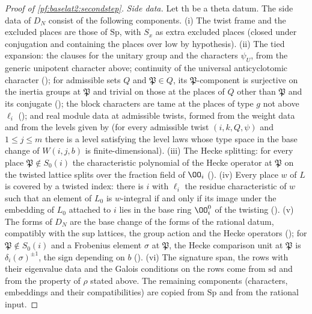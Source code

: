 \begin{proof}[Proof of \cref{pf:baselat2:secondstep}]
\emph{Side data.} Let $\mathrm{th}$ be a theta datum. The side data of $D_N$ consist of the following
components.
(i) The twist frame and the excluded places are those of $\mathrm{Sp}$, with $S_x$ as extra excluded places
(closed under conjugation and containing the places over $\mathrm{low}$ by hypothesis).
(ii) The tied expansion: the clauses for the unitary group and the characters $\psi_U$, from the generic
unipotent character above; continuity of the universal anticyclotomic character
(); for admissible sets $Q$ and $\mathfrak P\in Q$,
its $\mathfrak P$-component is surjective on the inertia groups at $\mathfrak P$ and trivial on those at the places of $Q$
other than $\mathfrak P$ and its conjugate (); the block
characters are tame at the places of type $g$ not above $\ell_i$
(); and real
module data at admissible twists, formed from the weight data and from the levels given by
 (for every admissible twist $(i,k,Q,\psi)$ and
$1\le j\le m$ there is a level satisfying the level laws whose type space in the base change of $W(i,j,b)$ is
finite-dimensional).
(iii) The Hecke splitting: for every place $\mathfrak P\notin S_0(i)$ the characteristic polynomial of the Hecke
operator at $\mathfrak P$ on the twisted lattice splits over the fraction field of $\OO_i$
().
(iv) Every place $w$ of $L$ is covered by a twisted index: there is $i$ with $\ell_i$ the residue characteristic of
$w$ such that an element of $L_0$ is $w$-integral if and only if its image under the embedding of $L_0$ attached
to $i$ lies in the base ring $\OO^0_i$ of the twisting
().
(v) The forms of $D_N$ are the base change of the forms of the rational datum, compatibly with the sup
lattices, the group action and the Hecke operators
(); for $\mathfrak P\notin S_0(i)$ and a
Frobenius element $\sigma$ at $\mathfrak P$, the Hecke comparison unit at $\mathfrak P$ is $\delta_i(\sigma)^{\pm1}$, the sign
depending on $b$ ().
(vi) The signature span, the rows with their eigenvalue data and the Galois conditions on the rows come
from $\mathrm{sd}$ and from the property of $\rho$ stated above.
The remaining components (characters, embeddings and their compatibilities) are copied from $\mathrm{Sp}$ and
from the rational input.
\end{proof}

